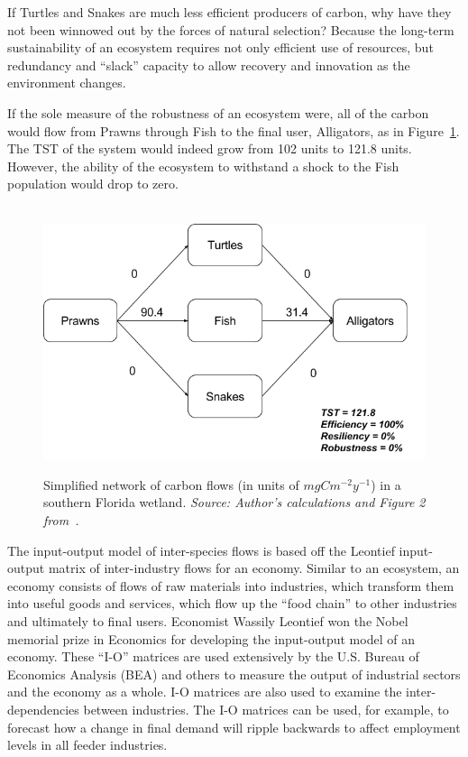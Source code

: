 \documentclass{article}
\begin{document}
If Turtles and Snakes are much less efficient producers of carbon,
why have they not been winnowed out by the forces of 
natural selection? Because the long-term
sustainability of an ecosystem requires not only
efficient use of resources, but redundancy and
``slack'' capacity to allow recovery and
innovation as the environment changes. 

If the sole measure of the robustness of
an ecosystem were, 
all of the carbon would flow from Prawns through
Fish to the final user, Alligators,  as
in Figure~\ref{fig:ulano_ex1}. The
TST
of the system would
indeed grow from 102 units to 121.8 units.
However, the ability of the ecosystem to
withstand a shock to the Fish population
would drop to zero. 

\begin{figure}[H]
\centering\
\includegraphics[width=.9\linewidth]{Images/Ulano_ex1.png}
\caption{Simplified network of carbon flows (in units of $mgCm^{-2}y^{-1}$) 
in a southern Florida wetland. 
\textit{Source: Author's calculations and Figure 2 from~\cite{ulanowicz_quantifying_2009}.}}
\label{fig:ulano_ex1}
\end{figure}

The input-output model of inter-species flows
is based off the Leontief input-output matrix of
inter-industry flows for an economy.
Similar to an ecosystem, an economy consists of flows of
raw materials into industries, which transform
them into useful goods and services, which flow 
up the ``food chain'' to other industries
and ultimately to final users.
Economist Wassily Leontief won the Nobel memorial 
prize in Economics
for developing the input-output model 
of an economy. These ``I-O'' matrices are used extensively
by the U.S. Bureau of Economics Analysis (BEA)
and others to measure the output of industrial
sectors and the economy as a whole. I-O matrices
are also used to examine the inter-dependencies between 
industries. The I-O matrices can be used,
for example,
to forecast how a change in final demand will ripple 
backwards to affect employment levels in
all feeder industries. 
\end{document}
